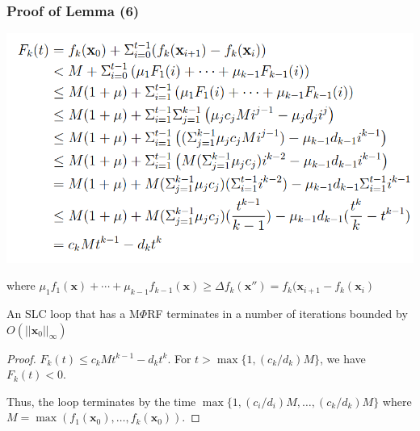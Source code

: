 \documentclass[11pt]{beamer}
\begin{document}
\begin{frame}\frametitle{Proof of Lemma (6)}
\begin{center}
\includegraphics[scale= 0.33]{14.png}
\end{center}
where $ \mu_1f_1(\textbf{x}) + \cdots + \mu_{k - 1}f_{k-1}(\textbf{x}) \ge \Delta f_k(\textbf{x}'') = f_k(\textbf{x}_{i+1} - f_k(\textbf{x}_{i})$
\end{frame}
\begin{frame}
\begin{theorem}[6]
An SLC loop that has a M$\Phi$RF terminates in a number of iterations bounded by $O(||\textbf{x}_0||_\infty)$
\end{theorem}

\begin{proof}
$F_k(t) \le c_kMt^{k - 1}- d_kt^k$. For $t > \max\{1, (c_k/d_k)M\}$, we have $F_k(t) < 0$.

Thus, the loop terminates by the time $\max\{1, (c_i/d_i)M, \ldots, (c_k/d_k)M\}$ where $M = \max(f_1(\textbf{x}_0), \ldots, f_k(\textbf{x}_0))$.

\end{proof}
\end{frame}
\end{document}
